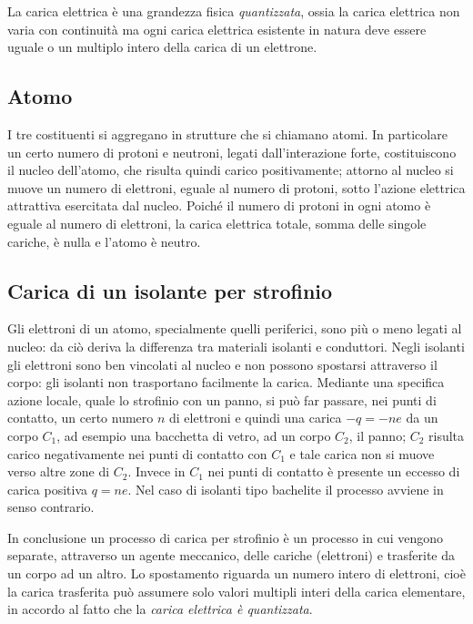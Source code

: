 \documentclass[class=book, crop=false, oneside, 12pt]{standalone}
\begin{document}
La carica elettrica è una grandezza fisica \emph{quantizzata}, ossia la carica elettrica non varia con continuità ma ogni carica elettrica esistente in natura deve essere uguale o un multiplo intero della carica di un elettrone.

\subsection{Atomo}

I tre costituenti si aggregano in strutture che si chiamano atomi. 
In particolare un certo numero di protoni e neutroni, legati dall'interazione forte, costituiscono il nucleo dell'atomo, che risulta quindi carico positivamente; attorno al nucleo si muove un numero di elettroni, eguale al numero di protoni, sotto l'azione elettrica attrattiva esercitata dal nucleo. 
Poiché il numero di protoni in ogni atomo è eguale al numero di elettroni, la carica elettrica totale, somma delle singole cariche, è nulla e l'atomo è neutro.

\subsection{Carica di un isolante per strofinio}

Gli elettroni di un atomo, specialmente quelli periferici, sono più o meno legati al nucleo: da ciò deriva la differenza tra materiali isolanti e conduttori. \newline
Negli isolanti gli elettroni sono ben vincolati al nucleo e non possono spostarsi attraverso il corpo: gli isolanti non trasportano facilmente la carica. \newline
Mediante una specifica azione locale, quale lo strofinio con un panno, si può far passare, nei punti di contatto, un certo numero \(n\) di elettroni e quindi una carica \(-q = -ne\) da un corpo \(C_1\), ad esempio una bacchetta di vetro, ad un corpo \(C_2\), il panno; 
\(C_2\) risulta carico negativamente nei punti di contatto con \(C_1\) e tale carica non si muove verso altre zone di \(C_2\). 
Invece in \(C_1\) nei punti di contatto è presente un eccesso di carica positiva \(q = ne\). \newline
Nel caso di isolanti tipo bachelite il processo avviene in senso contrario. 

In conclusione un processo di carica per strofinio è un processo in cui vengono separate, attraverso un agente meccanico, delle cariche (elettroni) e trasferite da un corpo ad un altro. 
Lo spostamento riguarda un numero intero di elettroni, cioè la carica trasferita può assumere solo valori multipli interi della carica elementare, in accordo al fatto che la \emph{carica elettrica è quantizzata}.
\end{document}
